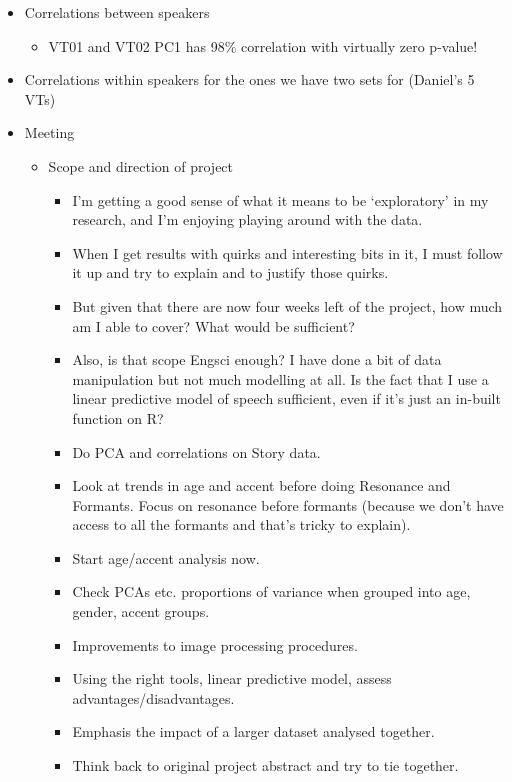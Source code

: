 \documentclass{article}
\begin{document}
\begin{itemize}
\begin{itemize}
\begin{itemize}
        \end{itemize}
    \end{itemize}
    \item Correlations between speakers
    \begin{itemize}
        \item VT01 and VT02 PC1 has 98\% correlation with virtually zero p-value!
    \end{itemize}
    \item Correlations within speakers for the ones we have two sets for (Daniel's 5 VTs) 
    \item Meeting
    \begin{itemize}
        \item Scope and direction of project
        \begin{itemize}
            \item I'm getting a good sense of what it means to be `exploratory' in my research, and I'm enjoying playing around with the data.
            \item When I get results with quirks and interesting bits in it, I must follow it up and try to explain and to justify those quirks.
            \item But given that there are now four weeks left of the project, how much am I able to cover? What would be sufficient?
            \item Also, is that scope Engsci enough? I have done a bit of data manipulation but not much modelling at all. Is the fact that I use a linear predictive model of speech sufficient, even if it's just an in-built function on R?
            \item Do PCA and correlations on Story data.
            \item Look at trends in age and accent before doing Resonance and Formants. Focus on resonance before formants (because we don't have access to all the formants and that's tricky to explain). 
            \item Start age/accent analysis now.
            \item Check PCAs etc. proportions of variance when grouped into age, gender, accent groups.
            \item Improvements to image processing procedures.
            \item Using the right tools, linear predictive model, assess advantages/disadvantages.
            \item Emphasis the impact of a larger dataset analysed together.
            \item Think back to original project abstract and try to tie together.

\end{itemize}
\end{itemize}
\end{itemize}
\end{document}
